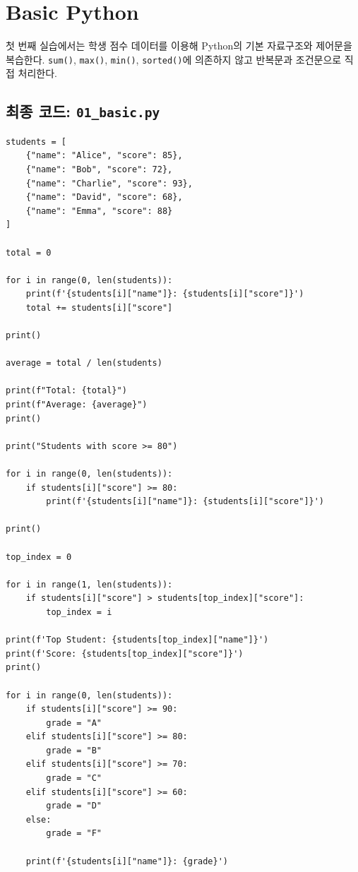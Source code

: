 \documentclass[11pt,a4paper]{article}
\begin{document}
\section{Basic Python}

첫 번째 실습에서는 학생 점수 데이터를 이용해 Python의 기본 자료구조와 제어문을 복습한다.
\texttt{sum()}, \texttt{max()}, \texttt{min()}, \texttt{sorted()}에 의존하지 않고 반복문과 조건문으로 직접 처리한다.

\subsection{최종 코드: \texttt{01\_basic.py}}

\begin{lstlisting}
students = [
    {"name": "Alice", "score": 85},
    {"name": "Bob", "score": 72},
    {"name": "Charlie", "score": 93},
    {"name": "David", "score": 68},
    {"name": "Emma", "score": 88}
]

total = 0

for i in range(0, len(students)):
    print(f'{students[i]["name"]}: {students[i]["score"]}')
    total += students[i]["score"]

print()

average = total / len(students)

print(f"Total: {total}")
print(f"Average: {average}")
print()

print("Students with score >= 80")

for i in range(0, len(students)):
    if students[i]["score"] >= 80:
        print(f'{students[i]["name"]}: {students[i]["score"]}')

print()

top_index = 0

for i in range(1, len(students)):
    if students[i]["score"] > students[top_index]["score"]:
        top_index = i

print(f'Top Student: {students[top_index]["name"]}')
print(f'Score: {students[top_index]["score"]}')
print()

for i in range(0, len(students)):
    if students[i]["score"] >= 90:
        grade = "A"
    elif students[i]["score"] >= 80:
        grade = "B"
    elif students[i]["score"] >= 70:
        grade = "C"
    elif students[i]["score"] >= 60:
        grade = "D"
    else:
        grade = "F"

    print(f'{students[i]["name"]}: {grade}')
\end{lstlisting}
\end{document}
